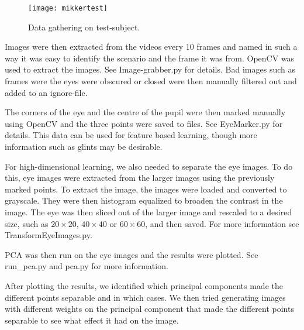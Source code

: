 \begin{figure}
\centering
\texttt{[image: mikkertest]}
\caption{Data gathering on test-subject.}
\label{fig:mikkertest}
\end{figure}


Images were then extracted from the videos every 10 frames and named in such a way it was easy to identify the scenario and the frame it was from. OpenCV was used to extract the images.
See Image-grabber.py for details. %
Bad images such as frames were the eyes were obscured or closed were then manually filtered out and added to an ignore-file.

The corners of the eye and the centre of the pupil were then marked manually using OpenCV and the three points were saved to files. See EyeMarker.py for details.
This data can be used for feature based learning, though more information such as glints may be desirable.  %

For high-dimensional learning, we also needed to separate the eye images.
To do this, eye images were extracted from the larger images using the previously marked points.
To extract the image, the images were loaded and converted to grayscale.
They were then histogram equalized to broaden the contrast in the image. %
The eye was then sliced out of the larger image and rescaled to a desired size, such as $20\times 20$, $40\times 40$ or $60\times 60$, and then saved.
For more information see TransformEyeImages.py. %

PCA was then run on the eye images %
and the results were plotted. See run\_pca.py and pca.py for more information. %

After plotting the results, we identified which principal components made the different points separable and in which cases.
We then tried generating images with different weights on the principal component that made the different points separable to see what effect it had on the image.

